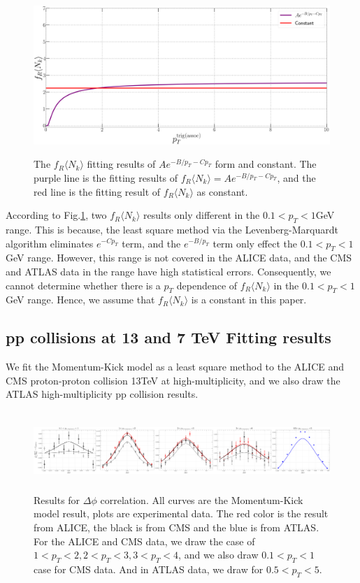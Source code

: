 \documentclass[jkps,fleqn,showpacs,showkeys]{revtex4}
\begin{document}
\begin{figure}[ht]
\centering
\includegraphics[width=12cm, height=6cm]{./Figures/ptVSnone}
\caption{The $f_R\langle N_k \rangle$ fitting results of $Ae^{-{B} / p_T -C p_{T}}$ form and constant. The purple line is the fitting results of $f_R\langle N_k \rangle = Ae^{-{B} / p_T -C p_{T}}$, and the red line is the fitting result of $f_R\langle N_k \rangle$ as constant. }
\label{figure:ptVSnone}
\end{figure}

According to Fig.\ref{figure:ptVSnone}, two $f_R \langle N_k \rangle$ results only different in the $0.1<p_T<1$GeV range.
This is because, the least square method via the Levenberg-Marquardt algorithm eliminates $e^{-Cp_T}$ term, and the $e^{-B/p_T}$ term only effect the $0.1<p_T<1$GeV range.
However, this range is not covered in the ALICE data, and the CMS and ATLAS data in the range have high statistical errors.
Consequently, we cannot determine whether there is a $p_T$ dependence of $f_R\langle N_k \rangle$ in the $0.1<p_T<1$GeV range.
Hence, we assume that $f_R\langle N_k \rangle$ is a constant in this paper.


\subsection{pp collisions at 13 and 7 TeV Fitting results}
\label{subsec: pp collisions Fitting results}

We fit the Momentum-Kick model as a least square method to the ALICE and CMS proton-proton collision 13TeV at high-multiplicity\cite{alice, cms}, and we also draw the ATLAS high-multiplicity pp collision results\cite{atlas}.

\begin{figure}[ht]
\centering
\includegraphics[width=18cm, height=3cm]{./Figures/Paper_phiCorr}
\caption{Results for $\Delta \phi$ correlation. All curves are the Momentum-Kick model result, plots are experimental data.
The red color is the result from ALICE, the black is from CMS and the blue is from ATLAS.
For the ALICE and CMS data, we draw the case of $1<p_T<2, 2<p_T<3, 3<p_T<4$, and we also draw $0.1<p_T<1$ case for CMS data. And in ATLAS data, we draw for $0.5<p_T<5$.}
\label{figure:phicorr}
\end{figure}
\end{document}

